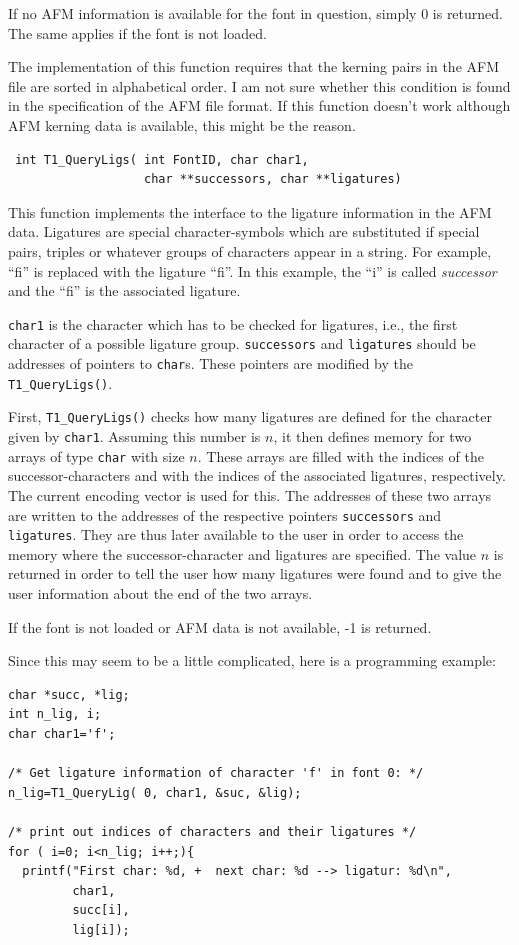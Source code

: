 If no AFM information is available for the font in question, simply 0
is returned. The same applies if the font is not loaded.

The implementation of this function requires that the kerning pairs in
the AFM file are sorted in alphabetical order. I am not sure
whether this condition is found in the specification of the AFM file
format. If this function doesn't work although AFM kerning data is
available, this might be the reason.

\precorr
\begin{verbatim}
 int T1_QueryLigs( int FontID, char char1,
                   char **successors, char **ligatures)
\end{verbatim}\postcorr
This function implements the interface to the ligature information in
the AFM data. Ligatures are special character-symbols which are
substituted if special pairs, 
triples or whatever groups of characters appear in a string. For example,
``f{}i'' is replaced with the ligature ``fi''. In this example, the ``i'' is
called {\em successor} and the ``fi'' is the associated ligature.

\verb+char1+ is the character
which has to be checked for ligatures, i.e., the first character of a possible
ligature group. \verb+successors+ and \verb+ligatures+ should be addresses of
pointers to \verb+char+s. These pointers are modified by the
\verb+T1_QueryLigs()+. 

First, \verb+T1_QueryLigs()+ checks how many ligatures are defined for the
character given by \verb+char1+. Assuming this number is $n$, it then
defines memory for two arrays of type \verb+char+ with size
$n$. These arrays are filled with the indices of the
successor-characters and with 
the indices of the associated ligatures, respectively. The current 
encoding vector is used for this. The addresses of these two arrays
are written to the
addresses of the respective  pointers \verb+successors+ and \verb+ligatures+.
They are thus later available to the user in order to access the memory where
the successor-character and ligatures are specified. The value $n$ is returned
in order to tell the user how many ligatures were found and to give
the user information about the end of the two arrays. 

If the font is not loaded or AFM data is not available, -1 is returned.

Since this may seem to be a little complicated, here is a programming example:
\begin{verbatim}
char *succ, *lig;
int n_lig, i;
char char1='f';

/* Get ligature information of character 'f' in font 0: */
n_lig=T1_QueryLig( 0, char1, &suc, &lig);

/* print out indices of characters and their ligatures */
for ( i=0; i<n_lig; i++;){
  printf("First char: %d, +  next char: %d --> ligatur: %d\n",
         char1,
         succ[i],
         lig[i]);
\end{verbatim}

